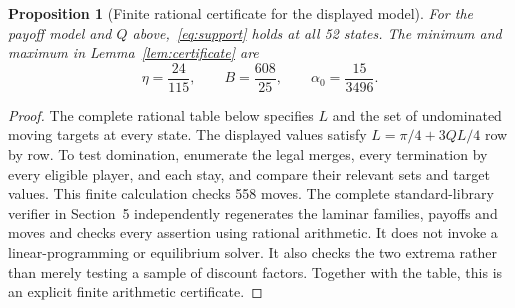 \documentclass[11pt,a4paper]{article}
\newtheorem{proposition}[theorem]{Proposition}
\theoremstyle{definition}\newtheorem{definition}[theorem]{Definition}
\theoremstyle{remark}\newtheorem{remark}[theorem]{Remark}
\newcommand{\1}{\mathbf 1}
\begin{document}
\begin{proposition}[Finite rational certificate for the displayed model]\label{prop:finite}
For the payoff model and $Q$ above,~\eqref{eq:support} holds at all 52 states. The minimum and maximum in Lemma~\ref{lem:certificate} are
\[
 \eta=\frac{24}{115},\qquad B=\frac{608}{25},\qquad
 \alpha_0=\frac{15}{3496}.
\]
\end{proposition}
\begin{proof}
The complete rational table below specifies $L$ and the set of undominated moving targets at every state. The displayed values satisfy $L=\pi/4+3QL/4$ row by row. To test domination, enumerate the legal merges, every termination by every eligible player, and each stay, and compare their relevant sets and target values. This finite calculation checks 558 moves. The complete standard-library verifier in Section~5 independently regenerates the laminar families, payoffs and moves and checks every assertion using rational arithmetic. It does not invoke a linear-programming or equilibrium solver. It also checks the two extrema rather than merely testing a sample of discount factors. Together with the table, this is an explicit finite arithmetic certificate.
\end{proof}
\end{document}

